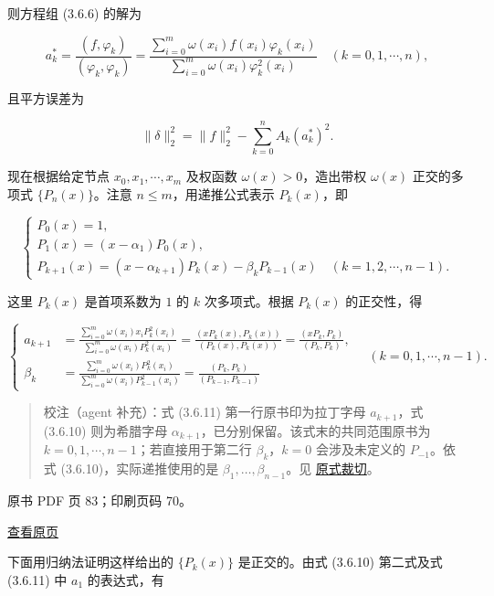 则方程组 (3.6.6) 的解为

\[
a_k^*=\frac{(f,\varphi_k)}{(\varphi_k,\varphi_k)}=\frac{\displaystyle\sum_{i=0}^m\omega(x_i)f(x_i)\varphi_k(x_i)}{\displaystyle\sum_{i=0}^m\omega(x_i)\varphi_k^2(x_i)}\quad(k=0,1,\cdots,n),\tag{3.6.9}
\]

且平方误差为

\[
\|\delta\|_2^2=\|f\|_2^2-\sum_{k=0}^n A_k(a_k^*)^2.
\]

现在根据给定节点 \(x_0,x_1,\cdots,x_m\) 及权函数 \(\omega(x)>0\)，造出带权 \(\omega(x)\) 正交的多项式 \(\{P_n(x)\}\)。注意 \(n\leqslant m\)，用递推公式表示 \(P_k(x)\)，即

\[
\begin{cases}
P_0(x)=1,\\
P_1(x)=(x-\alpha_1)P_0(x),\\
P_{k+1}(x)=(x-\alpha_{k+1})P_k(x)-\beta_kP_{k-1}(x)\quad(k=1,2,\cdots,n-1).
\end{cases}\tag{3.6.10}
\]

这里 \(P_k(x)\) 是首项系数为 \(1\) 的 \(k\) 次多项式。根据 \(P_k(x)\) 的正交性，得

\[
\left\{\begin{aligned}
a_{k+1}&=\frac{\displaystyle\sum_{i=0}^m\omega(x_i)x_iP_k^2(x_i)}{\displaystyle\sum_{i=0}^m\omega(x_i)P_k^2(x_i)}=\frac{(xP_k(x),P_k(x))}{(P_k(x),P_k(x))}=\frac{(xP_k,P_k)}{(P_k,P_k)},\\
\beta_k&=\frac{\displaystyle\sum_{i=0}^m\omega(x_i)P_k^2(x_i)}{\displaystyle\sum_{i=0}^m\omega(x_i)P_{k-1}^2(x_i)}=\frac{(P_k,P_k)}{(P_{k-1},P_{k-1})}
\end{aligned}\right.\quad(k=0,1,\cdots,n-1).\tag{3.6.11}
\]

\begin{quote}
校注（agent 补充）：式 (3.6.11) 第一行原书印为拉丁字母 \(a_{k+1}\)，式 (3.6.10) 则为希腊字母 \(\alpha_{k+1}\)，已分别保留。该式末的共同范围原书为 \(k=0,1,\cdots,n-1\)；若直接用于第二行 \(\beta_k\)，\(k=0\) 会涉及未定义的 \(P_{-1}\)。依式 (3.6.10)，实际递推使用的是 \(\beta_1,\ldots,\beta_{n-1}\)。见 \href{verified/assets/ch03b/p082-recursion-coefficients.png}{原式裁切}。
\end{quote}

\clearpage

原书 PDF 页 83；印刷页码 70。

\href{source-images/pdf-083.jpeg}{查看原页}

下面用归纳法证明这样给出的 \(\{P_k(x)\}\) 是正交的。由式 (3.6.10) 第二式及式 (3.6.11) 中 \(a_1\) 的表达式，有

